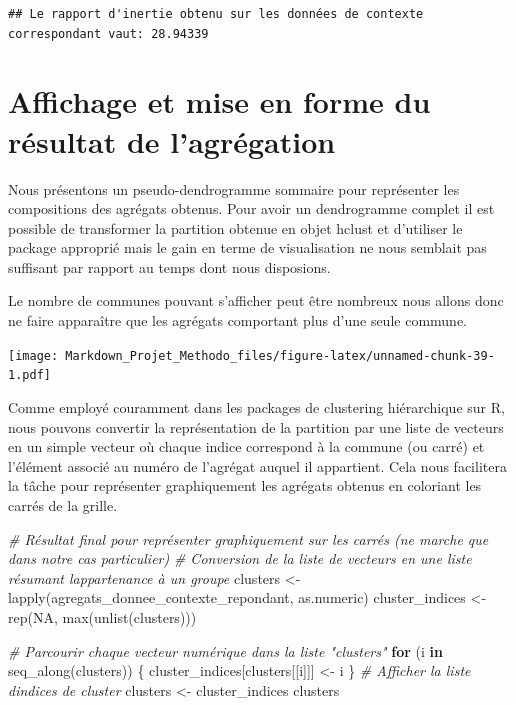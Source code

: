 \documentclass[
]{article}
\newenvironment{Shaded}{\begin{snugshade}}{\end{snugshade}}
\newcommand{\CommentTok}[1]{\textcolor[rgb]{0.56,0.35,0.01}{\textit{#1}}}
\newcommand{\ConstantTok}[1]{\textcolor[rgb]{0.00,0.00,0.00}{#1}}
\newcommand{\ControlFlowTok}[1]{\textcolor[rgb]{0.13,0.29,0.53}{\textbf{#1}}}
\newcommand{\FunctionTok}[1]{\textcolor[rgb]{0.00,0.00,0.00}{#1}}
\newcommand{\NormalTok}[1]{#1}
\newcommand{\OtherTok}[1]{\textcolor[rgb]{0.56,0.35,0.01}{#1}}
\begin{document}
\begin{verbatim}
## Le rapport d'inertie obtenu sur les données de contexte correspondant vaut: 28.94339
\end{verbatim}

\hypertarget{affichage-et-mise-en-forme-du-ruxe9sultat-de-lagruxe9gation}{%
\section{Affichage et mise en forme du résultat de
l'agrégation}\label{affichage-et-mise-en-forme-du-ruxe9sultat-de-lagruxe9gation}}

Nous présentons un pseudo-dendrogramme sommaire pour représenter les
compositions des agrégats obtenus. Pour avoir un dendrogramme complet il
est possible de transformer la partition obtenue en objet hclust et
d'utiliser le package approprié mais le gain en terme de visualisation
ne nous semblait pas suffisant par rapport au temps dont nous
disposions.

Le nombre de communes pouvant s'afficher peut être nombreux nous allons
donc ne faire apparaître que les agrégats comportant plus d'une seule
commune.

\texttt{[image: Markdown\_Projet\_Methodo\_files/figure-latex/unnamed-chunk-39-1.pdf]}

Comme employé couramment dans les packages de clustering hiérarchique
sur R, nous pouvons convertir la représentation de la partition par une
liste de vecteurs en un simple vecteur où chaque indice correspond à la
commune (ou carré) et l'élément associé au numéro de l'agrégat auquel il
appartient. Cela nous facilitera la tâche pour représenter graphiquement
les agrégats obtenus en coloriant les carrés de la grille.

\begin{Shaded}
\begin{Highlighting}[]
\CommentTok{\# Résultat final pour représenter graphiquement sur les carrés (ne marche que dans notre cas particulier)}
\CommentTok{\# Conversion de la liste de vecteurs en une liste résumant l\textquotesingle{}appartenance à un groupe}
\NormalTok{clusters }\OtherTok{\textless{}{-}} \FunctionTok{lapply}\NormalTok{(agregats\_donnee\_contexte\_repondant, as.numeric)}
\NormalTok{cluster\_indices }\OtherTok{\textless{}{-}} \FunctionTok{rep}\NormalTok{(}\ConstantTok{NA}\NormalTok{, }\FunctionTok{max}\NormalTok{(}\FunctionTok{unlist}\NormalTok{(clusters)))}

\CommentTok{\# Parcourir chaque vecteur numérique dans la liste "clusters"}
\ControlFlowTok{for}\NormalTok{ (i }\ControlFlowTok{in} \FunctionTok{seq\_along}\NormalTok{(clusters)) \{}
\NormalTok{  cluster\_indices[clusters[[i]]] }\OtherTok{\textless{}{-}}\NormalTok{ i}
\NormalTok{\}}
\CommentTok{\# Afficher la liste d\textquotesingle{}indices de cluster}
\NormalTok{clusters }\OtherTok{\textless{}{-}}\NormalTok{ cluster\_indices }
\NormalTok{clusters}
\end{Highlighting}
\end{Shaded}
\end{document}
